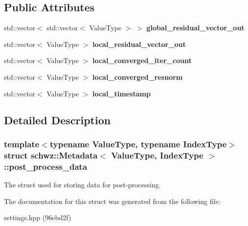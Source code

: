 \subsection*{Public Attributes}
\begin{DoxyCompactItemize}
\item 
\mbox{\label{structschwz_1_1Metadata_1_1post__process__data_a3cd4dc39548794213196924e925947e4}} 
std\+::vector$<$ std\+::vector$<$ Value\+Type $>$ $>$ {\bfseries global\+\_\+residual\+\_\+vector\+\_\+out}
\item 
\mbox{\label{structschwz_1_1Metadata_1_1post__process__data_ac508dd9baaf55fe3eefaac84a081ea07}} 
std\+::vector$<$ Value\+Type $>$ {\bfseries local\+\_\+residual\+\_\+vector\+\_\+out}
\item 
\mbox{\label{structschwz_1_1Metadata_1_1post__process__data_ae089ea8c22e004373eb6f53c2db01383}} 
std\+::vector$<$ Value\+Type $>$ {\bfseries local\+\_\+converged\+\_\+iter\+\_\+count}
\item 
\mbox{\label{structschwz_1_1Metadata_1_1post__process__data_af03f16caf28849a9b1946c52d7d628fb}} 
std\+::vector$<$ Value\+Type $>$ {\bfseries local\+\_\+converged\+\_\+resnorm}
\item 
\mbox{\label{structschwz_1_1Metadata_1_1post__process__data_ae314f010b4a16d0e1b103bf40099aa7d}} 
std\+::vector$<$ Value\+Type $>$ {\bfseries local\+\_\+timestamp}
\end{DoxyCompactItemize}


\subsection{Detailed Description}
\subsubsection*{template$<$typename Value\+Type, typename Index\+Type$>$\newline
struct schwz\+::\+Metadata$<$ Value\+Type, Index\+Type $>$\+::post\+\_\+process\+\_\+data}

The struct used for storing data for post-\/processing. 

The documentation for this struct was generated from the following file\+:\begin{DoxyCompactItemize}
\item 
settings.\+hpp (96ebd2f)\end{DoxyCompactItemize}
